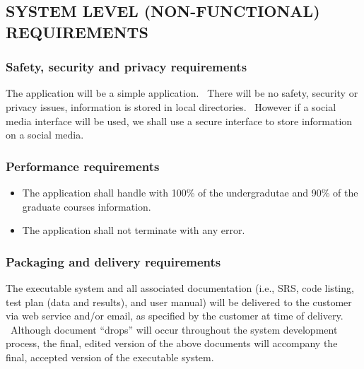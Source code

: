 \documentclass[twoside,letterpaper]{article}
\begin{document}
\subsection[SYSTEM LEVEL (NON{}-FUNCTIONAL)
REQUIREMENTS]{\rmfamily\bfseries\color{black}
SYSTEM LEVEL (NON-FUNCTIONAL) REQUIREMENTS}

\subsubsection[Safety, security and privacy
requirements]{\rmfamily\bfseries\color{black}
Safety, security and privacy requirements}

{\color{black}
The application will be a simple application. \ There will be no safety, security or privacy issues, information is stored in local directories. \ However if a social media interface will be used, we shall use a secure interface to store information on a social media. }

\subsubsection[Performance
requirements]{\rmfamily\bfseries\color{black}
Performance requirements}

\noindent\begin{itemize}
  \item The application shall handle with 100\% of the undergradutae and 90\% of the graduate courses information.
  \item The application shall not terminate with any error.
\end{itemize}

\subsubsection[Packaging and delivery
requirements]{\rmfamily\bfseries\color{black}
Packaging and delivery requirements}

{\color{black}
The executable system and all associated documentation (i.e., SRS,
code listing, test plan (data and results), and user manual) will be
delivered to the customer via web service and/or email, as
specified by the customer at time of delivery. \ Although document
{\textquotedblleft}drops{\textquotedblright} will occur throughout the
system development process, the final, edited version of the above
documents will accompany the final, accepted version of the executable
system.}
\end{document}
